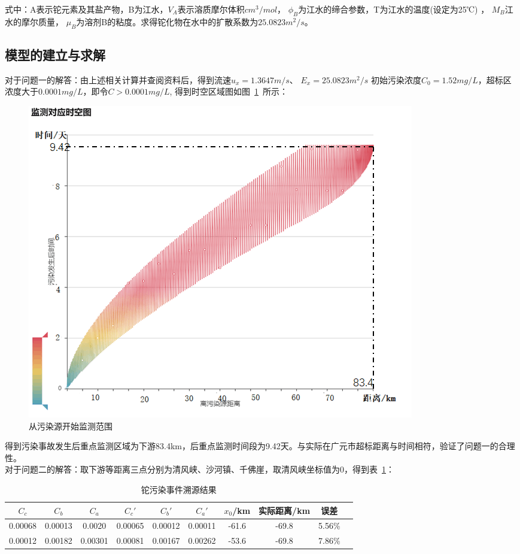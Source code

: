 \documentclass{whutmod}
\begin{document}
	式中：A表示铊元素及其盐产物，B为江水，$V_{A}$表示溶质摩尔体积$cm^{3}/mol$， 
	$\phi_{B}$为江水的缔合参数，T为江水的温度(设定为25℃) ，
	$M_{B}$江水的摩尔质量，
	$\mu_{B}$为溶剂B的粘度。求得铊化物在水中的扩散系数为$25.0823m^{2}/s$。
	\subsection{模型的建立与求解}
对于问题一的解答：由上述相关计算并查阅资料后，得到流速$u_{x}=1.3647m/s$、 $E_{x}=25.0823m^{2}/s$ 初始污染浓度$C_{0}=1.52mg/L$，超标区浓度大于$0.0001mg/L$，即令$C>0.0001mg/L$, 得到时空区域图如图~\ref{skfbt}~所示：
\begin{figure}[H]
	\centering
	\includegraphics[width=.8\textwidth]{figures/zaojiatu.png}
	\caption{从污染源开始监测范围}\label{skfbt}
\end{figure}
得到污染事故发生后重点监测区域为下游83.4km，后重点监测时间段为9.42天。与实际在广元市超标距离与时间相符，验证了问题一的合理性。
~\\

对于问题二的解答：取下游等距离三点分别为清风峡、沙河镇、千佛崖，取清风峡坐标值为0，得到表~\ref{zzz}：
	\begin{table}[H]
	\caption{铊污染事件溯源结果}\label{zzz} \centering
	\begin{tabular}{cccccccccc}
		\toprule[1.5pt]
		$C_{c}$& $C_{b}$ & $C_{a}$ &${C_{c}}'$ & ${C_{b}}'$&${C_{a}}'$&$x_{0}$/km&实际距离/km& 误差\\
		\midrule[1pt]
		0.00068&0.00013 &0.0020&0.00065&0.00012&0.00011&-61.6&-69.8&5.56\%\\
		0.00012& 0.00182 &0.00301&0.00081&0.00167&0.00262&-53.6&-69.8&7.86\%\\
		\bottomrule[1.5pt]
	\end{tabular}
\end{table}
\end{document}
